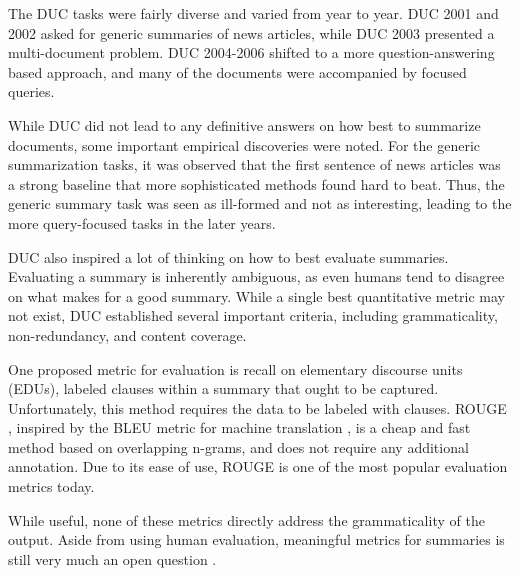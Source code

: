 \documentclass[12pt]{report}
\begin{document}
The DUC tasks were fairly diverse and varied from year to year. DUC 2001 and 2002 asked for generic summaries of news articles, while DUC 2003 presented a multi-document problem. DUC 2004-2006 shifted to a more question-answering based approach, and many of the documents were accompanied by focused queries.

While DUC did not lead to any definitive answers on how best to summarize documents, some important empirical discoveries were noted.
For the generic summarization tasks, it was observed that the first sentence of news articles was a strong baseline that more sophisticated methods found hard to beat. Thus, the generic summary task was seen as ill-formed and not as interesting, leading to the more query-focused tasks in the later years.


DUC also inspired a lot of thinking on how to best evaluate summaries. Evaluating a summary is inherently ambiguous, as even humans tend to disagree on what makes for a good summary.
While a single best quantitative metric may not exist, DUC established several important criteria, including grammaticality, non-redundancy, and content coverage.

One proposed metric for evaluation is recall on elementary discourse units (EDUs), labeled clauses within a summary that ought to be captured. Unfortunately, this method requires the data to be labeled with clauses. ROUGE \citep{lin2004rouge}, inspired by the BLEU metric for machine translation \citep{Papineni2002}, is a cheap and fast method based on overlapping n-grams, and does not require any additional annotation. Due to its ease of use, ROUGE is one of the most popular evaluation metrics today.




While useful, none of these metrics directly address the grammaticality of the output. Aside from using human evaluation, meaningful metrics for summaries is still very much an open question \citep{toutanova2016summarymetrics}.


\vspace{0.5cm}

 

\end{document}
